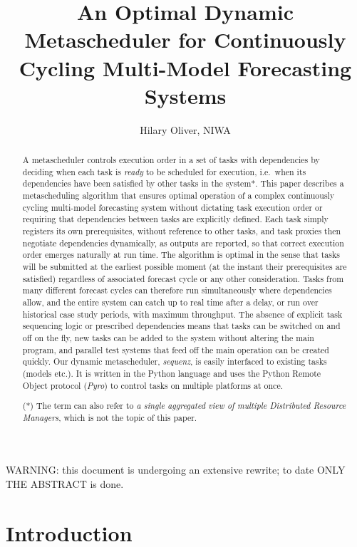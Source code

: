\documentclass[11pt,a4paper]{article}
\title{An Optimal Dynamic Metascheduler for Continuously Cycling
Multi-Model Forecasting Systems}
\author{Hilary Oliver, NIWA}
\begin{document}
\maketitle
\tableofcontents

{\huge WARNING: this document is undergoing an extensive rewrite; to
date ONLY THE ABSTRACT is done.}

\begin{abstract}

A metascheduler controls execution order in a set of tasks with
dependencies by deciding when each task is {\em ready} to be scheduled
for execution, i.e.\ when its dependencies have been satisfied by other
tasks in the system*. This paper describes a metascheduling algorithm
that ensures optimal operation of a complex continuously cycling
multi-model forecasting system without dictating task execution order or
requiring that dependencies between tasks are explicitly defined. Each
task simply registers its own prerequisites, without reference to other
tasks, and task proxies then negotiate dependencies dynamically, as
outputs are reported, so that correct execution order emerges naturally
at run time.  The algorithm is optimal in the sense that tasks will be
submitted at the earliest possible moment (at the instant their
prerequisites are satisfied) regardless of associated forecast cycle or
any other consideration.  Tasks from many different forecast cycles can
therefore run simultaneously where dependencies allow, and the entire
system can catch up to real time after a delay, or run over historical
case study periods, with maximum throughput. The absence of explicit
task sequencing logic or prescribed dependencies means that tasks can be
switched on and off on the fly, new tasks can be added to the system
without altering the main program, and parallel test systems that feed
off the main operation can be created quickly. Our dynamic
metascheduler, {\em sequenz}, is easily interfaced to existing tasks
(models etc.). It is written in the Python language and uses the Python
Remote Object protocol ({\em Pyro}) to control tasks on multiple
platforms at once. 

(*) The term can also refer to {\it a single aggregated view of multiple
Distributed Resource Managers}, which is not the topic of this paper.

\end{abstract}

\section{Introduction}
\end{document}
